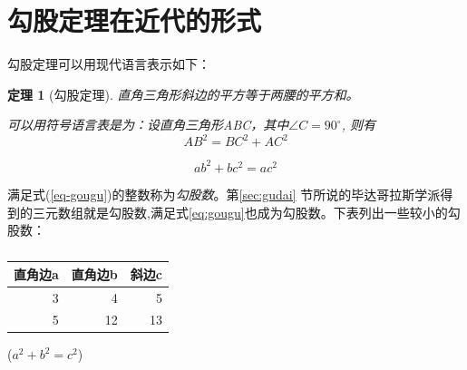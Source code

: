 \documentclass[UTF8]{ctexart}
\newtheorem{thm}{定理}
\newcommand{\degree}{^\circ}
\begin{document}
	\section{勾股定理在近代的形式}
	勾股定理可以用现代语言表示如下：
	\begin{thm}[勾股定理]
		直角三角形斜边的平方等于两腰的平方和。
		
可以用符号语言表是为：设直角三角形ABC，其中$\angle C = 90\degree$, 则有
		\begin{equation}
			AB^2 = BC^2+AC^2 \label{eq-gougu}
		\end{equation} 
	\end{thm}	
	
	\begin{equation}\label{eq:gougu}
		ab^2+bc^2=ac^2
	\end{equation}
	
	满足式(\ref{eq-gougu})的整数称为\emph{勾股数}。第\ref{sec:gudai}%
	节所说的毕达哥拉斯学派得到的三元数组就是勾股数,满足式\eqref{eq:gougu}也成为勾股数。下表列出一些较小的勾股数：
	\begin{table}[H] %
		\centering
		\begin{tabular}{|r r r|}
			\hline
			直角边a & 直角边b & 斜边c\\
			\hline
			3 &4 & 5 \\
			5 & 12 & 13 \\
			\hline
		\end{tabular}%
		\qquad  %
		($a^2+b^2=c^2$)
		\caption{}
		\label{fig:1}
	\end{table}
		
		

	
	\nocite{Shiye}
	
\end{document}

